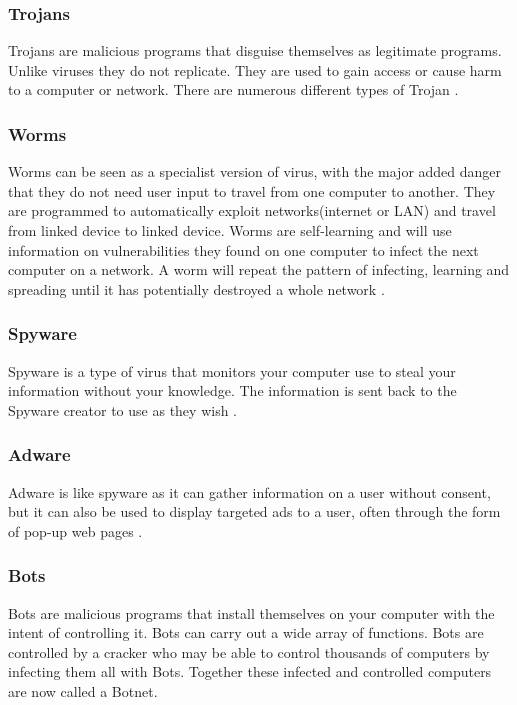 \documentclass[11pt, twocolumn]{article}
\begin{document}
\subsubsection{Trojans}

Trojans are malicious programs that disguise themselves as legitimate programs.  Unlike viruses they do not replicate.  They are used to gain access or cause harm to a computer or network.  There are numerous different types of Trojan \cite{Bas}.

\subsubsection{Worms}
Worms can be seen as a specialist version of virus, with the major added danger that they do not need user input to travel from one computer to another.  They are programmed to automatically exploit networks(internet or LAN) and travel from linked device to linked device. Worms are self-learning and will use information on vulnerabilities they found on one computer to infect the next computer on a network.  A worm will repeat the pattern of infecting, learning and spreading until it has potentially destroyed a whole network \cite{Bas}.

\subsubsection{Spyware}
Spyware is a type of virus that monitors your computer use to steal your information without your knowledge.  The information is sent back to the Spyware creator to use as they wish \cite{Bas}.

\subsubsection{Adware}
Adware is like spyware as it can gather information on a user without consent, but it can also be used to display targeted ads to a user, often through the form of pop-up web pages \cite{Bas}.

\subsubsection{Bots}
Bots are malicious programs that install themselves on your computer with the intent of controlling it.  Bots can carry out a wide array of functions.  Bots are controlled by a cracker who may be able to control thousands of computers by infecting them all with Bots.  Together these infected and controlled computers are now called a Botnet.
\end{document}

